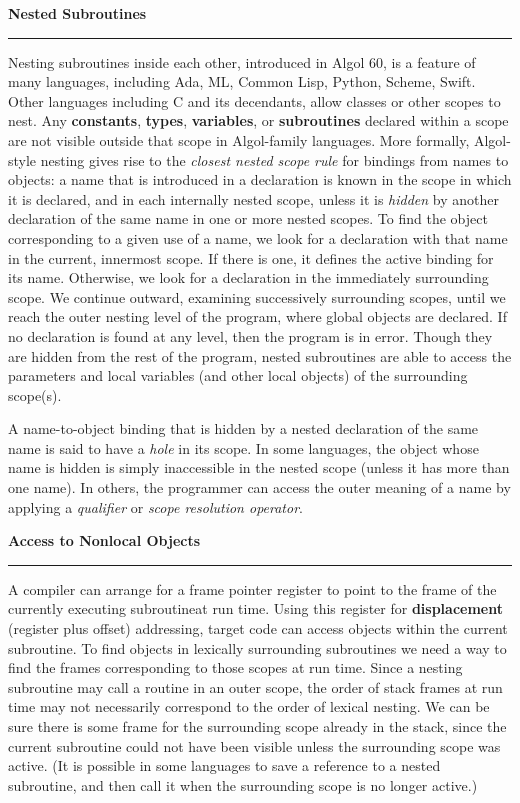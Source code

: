 \nopagenumbers
{\bf Nested Subroutines}
\vskip 1mm
\hrule

\vskip 6pt
Nesting subroutines inside each other, introduced in Algol 60, is a feature of many languages, including Ada, ML, Common Lisp, Python, Scheme, Swift. Other languages including C and its decendants, allow classes or other scopes to nest. Any {\bf constants}, {\bf types}, {\bf variables}, or {\bf subroutines} declared within a scope are not visible outside that scope in Algol-family languages. More formally, Algol-style nesting gives rise to the {\it closest nested scope rule} for bindings from names to objects: a name that is introduced in a declaration is known in the scope in which it is declared, and in each internally nested scope, unless it is {\it hidden} by another declaration of the same name in one or more nested scopes. To find the object corresponding to a given use of a name, we look for a declaration with that name in the current, innermost scope. If there is one, it defines the active binding for its name. Otherwise, we look for a declaration in the immediately surrounding scope. We continue outward, examining successively surrounding scopes, until we reach the outer nesting level of the program, where global objects are declared. If no declaration is found at any level, then the program is in error. Though they are hidden from the rest of the program, nested subroutines are able to access the parameters and local variables (and other local objects) of the surrounding scope(s).

\vskip 6pt
A name-to-object binding that is hidden by a nested declaration of the same name is said to have a {\it hole} in its scope. In some languages, the object whose name is hidden is simply inaccessible in the nested scope (unless it has more than one name). In others, the programmer can access the outer meaning of a name by applying a {\it qualifier} or {\it scope resolution operator}.

\vskip 12pt
{\bf Access to Nonlocal Objects}
\vskip 1mm
\hrule

\vskip 6pt
A compiler can arrange for a frame pointer register to point to the frame of the currently executing subroutineat run time. Using this register for {\bf displacement} (register plus offset) addressing, target code can access objects within the current subroutine. To find objects in lexically surrounding subroutines we need a way to find the frames corresponding to those scopes at run time. Since a nesting subroutine may call a routine in an outer scope, the order of stack frames at run time may not necessarily correspond to the order of lexical nesting. We can be sure there is some frame for the surrounding scope already in the stack, since the current subroutine could not have been visible unless the surrounding scope was active. (It is possible in some languages to save a reference to a nested subroutine, and then call it when the surrounding scope is no longer active.)

